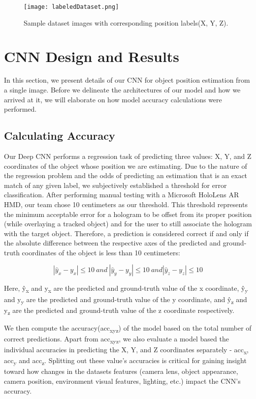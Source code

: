 \documentclass{article}
\begin{document}
\begin{figure}[h]
  \centering
  \texttt{[image: labeledDataset.png]}
  \caption{Sample dataset images with corresponding position labels(X, Y, Z).}
  \label{fig:sampledata}
\end{figure}


\section{CNN Design and Results}
\label{design_results}
In this section, we present details of our CNN for object position estimation from a single image. Before we delineate the architectures of our model and how we arrived at it, we will elaborate on how model accuracy calculations were performed.

\subsection{Calculating Accuracy}
Our Deep CNN performs a regression task of predicting three values:  X, Y, and Z coordinates of the object whose position we are estimating. Due to the nature of the regression problem and the odds of predicting an estimation that is an exact match of any given label, we subjectively established a threshold for error classification. After performing manual testing with a Microsoft HoloLens AR HMD, our team chose 10 centimeters as our threshold. This threshold represents the minimum acceptable error for a hologram to be offset from its proper position (while overlaying a tracked object) and for the user to still associate the hologram with the target object. Therefore, a prediction is considered correct if and only if the absolute difference between the respective axes of the predicted and ground-truth coordinates of the object is less than 10 centimeters:

$$\left|\hat{y}_{x} - y_{x}\right| \le 10\ and\ \left|\hat{y}_{y} - y_{y}\right| \le 10\ and \left|\hat{y}_{z} - y_{z}\right| \le 10$$

Here, ŷ\textsubscript{x} and y\textsubscript{x} are the predicted and ground-truth value of the x coordinate,
ŷ\textsubscript{y} and y\textsubscript{y} are the predicted and ground-truth value of the y coordinate, and ŷ\textsubscript{z} and y\textsubscript{z} are the predicted and ground-truth value of the z coordinate respectively.

We then compute the accuracy(acc\textsubscript{xyz}) of the model based on the total number of correct predictions. Apart from acc\textsubscript{xyz}, we also evaluate a model based the individual accuracies in predicting the X, Y, and Z coordinates separately - acc\textsubscript{x}, acc\textsubscript{y} and acc\textsubscript{z}. Splitting out these value's accuracies is critical for gaining insight toward how changes in the datasets features (camera lens, object appearance, camera position, environment visual features, lighting, etc.) impact the CNN's accuracy.
\end{document}
